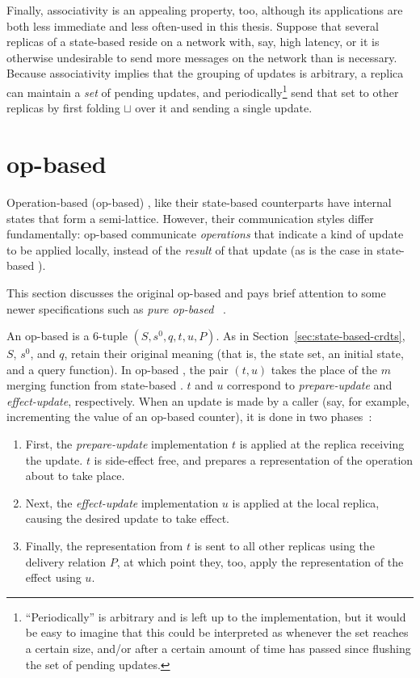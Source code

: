 Finally, associativity is an appealing property, too, although its applications
are both less immediate and less often-used in this thesis. Suppose that several
replicas of a state-based \CRDT reside on a network with, say, high latency, or
it is otherwise undesirable to send more messages on the network than is
necessary. Because associativity implies that the grouping of updates is
arbitrary, a replica can maintain a \textit{set} of pending updates, and
periodically\footnote{``Periodically'' is arbitrary and is left up to the
implementation, but it would be easy to imagine that this could be interpreted
as whenever the set reaches a certain size, and/or after a certain amount of
time has passed since flushing the set of pending updates.} send that set to
other replicas by first folding $\sqcup$ over it and sending a single update.

\section{op-based \CRDTs}
\label{sec:op-based-crdts}

Operation-based (op-based) \CRDTs, like their state-based counterparts have
internal states that form a semi-lattice. However, their communication styles
differ fundamentally: op-based \CRDTs communicate \textit{operations} that
indicate a kind of update to be applied locally, instead of the \textit{result}
of that update (as is the case in state-based \CRDTs).

This section discusses the original op-based \CRDTs and pays brief attention to
some newer specifications such as \textit{pure op-based \CRDTs}~\citep{shapiro11,
baquero17}.

An op-based \CRDT is a $6$-tuple $(S, s^0, q, t, u, P)$. As in
Section~\ref{sec:state-based-crdts}, $S$, $s^0$, and $q$, retain their
original meaning (that is, the state set, an initial state, and a query
function).  In op-based \CRDTs, the pair $(t,u)$ takes the place of the $m$
merging function from state-based \CRDTs. $t$ and $u$ correspond to
\textit{prepare-update} and \textit{effect-update}, respectively. When an update
is made by a caller (say, for example, incrementing the value of an op-based
\CRDT counter), it is done in two phases~\citep{shapiro11}:
\begin{enumerate}
  \item First, the \textit{prepare-update} implementation $t$ is applied at the
    replica receiving the update. $t$ is side-effect free, and prepares a
    representation of the operation about to take place.
  \item Next, the \textit{effect-update} implementation $u$ is applied at the
    local replica, causing the desired update to take effect.
  \item Finally, the representation from $t$ is sent to all other replicas using
    the delivery relation $P$, at which point they, too, apply the
    representation of the effect using $u$.
\end{enumerate}

